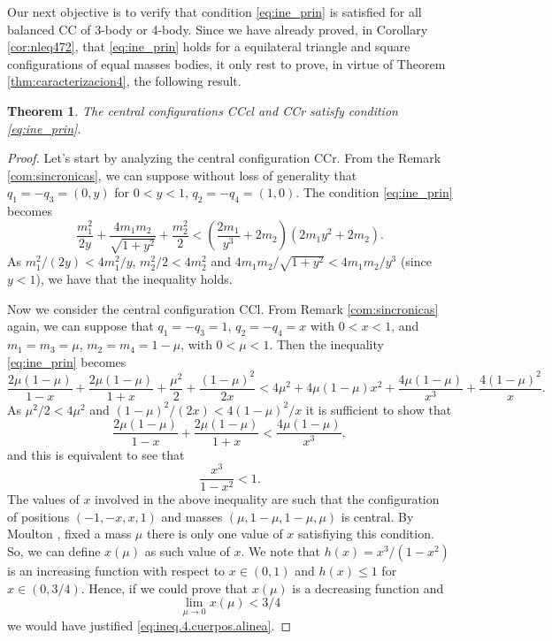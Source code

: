 \documentclass[twoside]{article}
\newtheorem{thm}{Theorem}[section]
\theoremstyle{remark}
\begin{document}
Our next objective is to verify that condition \eqref{eq:ine_prin} is satisfied for all balanced CC of 3-body or 4-body. Since we have already proved, in  Corollary \ref{cor:nleq472}, that \eqref{eq:ine_prin} holds for a equilateral triangle and square configurations of equal masses bodies, it only rest to prove, in virtue of Theorem \ref{thm:caracterizacion4}, the following result.



\begin{thm}\label{thm:CC.3.4.satis.cond.adm}
The central configurations CCcl and CCr satisfy condition \eqref{eq:ine_prin}.
\end{thm}



\begin{proof}

Let's start by analyzing the central configuration CCr. From the Remark \ref{com:sincronicas}, we can suppose without loss of generality that $ q_1 = -q_3 = (0, y) $ for $ 0<y<1 $, $ q_2 = -q_4 = (1,0) $. The condition \eqref{eq:ine_prin} becomes
\[\frac{m_1^2}{2y}+\frac{4m_1m_2}{\sqrt{1+y^2}}+\frac{m_2^2}{2}<\left(\frac{2m_1}{y^3}+2m_2\right) \left(2m_1y^2+2m_2\right).\]
As $m_1^2/(2y)<4m_1^2/y$, $m_2^2/2<4m_2^2$ and $4m_1m_2/\sqrt{1+y^2}<4m_1m_2/y^3$ (since $y<1$), we have that the inequality holds.

 Now we consider the central configuration CCl. From Remark \ref{com:sincronicas} again, we can suppose  that $q_1=-q_3=1$, $q_2=-q_4=x$ with $0<x<1$, and $m_1=m_3=\mu$, $m_2=m_4=1-\mu$, with $0<\mu<1$.  Then the inequality \eqref{eq:ine_prin} becomes
\[\frac{2\mu(1-\mu)}{1-x} +\frac{2\mu(1-\mu)}{1+x}+\frac{\mu^2}{2}+\frac{(1-\mu)^2}{2x}<4\mu^2+4\mu(1-\mu)x^2+\frac{4\mu(1-\mu)}{x^3}+\frac{4(1-\mu)^2}{x}.\]
As $ \mu ^ 2/2 <4 \mu^2$ and $ (1-\mu)^2/(2x)< 4(1-\mu)^2/x $ it is sufficient to show that
\[\frac{2\mu(1-\mu)}{1-x} +\frac{2\mu(1-\mu)}{1+x}<\frac{4\mu(1-\mu)}{x^3},\]
and this is equivalent to see that
\begin{equation}\label{eq:ineq.4.cuerpos.alinea}
\frac{x^3}{1-x^2}<1.
\end{equation}
The values of $x$ involved in the above inequality are such that the configuration of positions $(-1,-x,x,1)$ and masses $(\mu,1-\mu,1-\mu,\mu)$ is central. By Moulton \cite{moulton1910straight}, fixed a mass $\mu$ there is only one value of $x$ satisfiying this condition. So, we can define $x(\mu)$ as such value of $x$.  We note that $h(x)=x^3/(1-x^2)$ is an increasing function with respect to $x\in (0,1)$ and $h(x)\leq 1$ for $x\in (0,3/4)$. Hence, if we could prove that $x(\mu)$ is a decreasing function and
\begin{equation}\label{eq:ineq.4.cuerpos.lim0}
\lim\limits_{\mu\to 0}x(\mu)<3/4
\end{equation}
we would have justified \eqref {eq:ineq.4.cuerpos.alinea}.


\end{proof}
\end{document}
